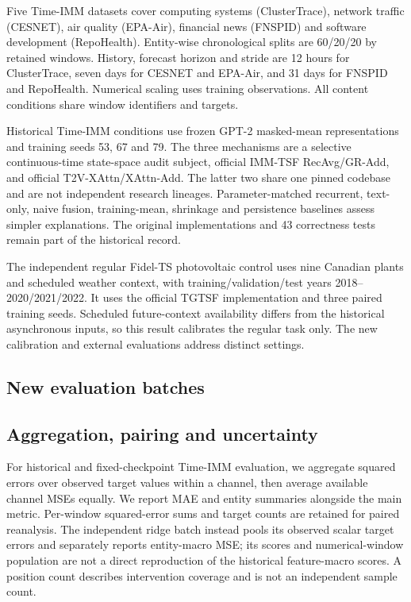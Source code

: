 \documentclass[preprint,11pt]{elsarticle}
\begin{document}
Five Time-IMM datasets cover computing systems (ClusterTrace), network traffic (CESNET), air quality (EPA-Air), financial news (FNSPID) and software development (RepoHealth). Entity-wise chronological splits are 60/20/20 by retained windows. History, forecast horizon and stride are 12 hours for ClusterTrace, seven days for CESNET and EPA-Air, and 31 days for FNSPID and RepoHealth. Numerical scaling uses training observations. All content conditions share window identifiers and targets.

Historical Time-IMM conditions use frozen GPT-2 masked-mean representations and training seeds 53, 67 and 79. The three mechanisms are a selective continuous-time state-space audit subject, official IMM-TSF RecAvg/GR-Add, and official T2V-XAttn/XAttn-Add. The latter two share one pinned codebase and are not independent research lineages. Parameter-matched recurrent, text-only, naive fusion, training-mean, shrinkage and persistence baselines assess simpler explanations. The original implementations and 43 correctness tests remain part of the historical record.

The independent regular Fidel-TS photovoltaic control uses nine Canadian plants and scheduled weather context, with training/validation/test years 2018--2020/2021/2022. It uses the official TGTSF implementation and three paired training seeds. Scheduled future-context availability differs from the historical asynchronous inputs, so this result calibrates the regular task only. The new calibration and external evaluations address distinct settings.

\subsection{New evaluation batches}



\subsection{Aggregation, pairing and uncertainty}

For historical and fixed-checkpoint Time-IMM evaluation, we aggregate squared errors over observed target values within a channel, then average available channel MSEs equally. We report MAE and entity summaries alongside the main metric. Per-window squared-error sums and target counts are retained for paired reanalysis. The independent ridge batch instead pools its observed scalar target errors and separately reports entity-macro MSE; its scores and numerical-window population are not a direct reproduction of the historical feature-macro scores. A position count describes intervention coverage and is not an independent sample count.
\end{document}
